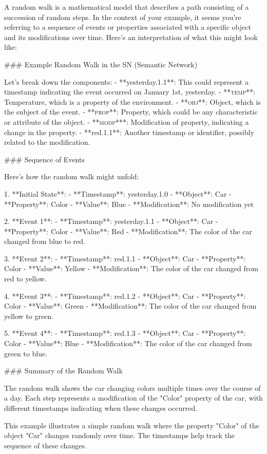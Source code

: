 A random walk is a mathematical model that describes a path consisting of a succession of random steps. In the context of your example, it seems you're referring to a sequence of events or properties associated with a specific object and its modifications over time. Here's an interpretation of what this might look like:

### Example Random Walk in the SN (Semantic Network)

Let's break down the components:
- **yesterday.1.1**: This could represent a timestamp indicating the event occurred on January 1st, yesterday.
- **\textsc{temp}**: Temperature, which is a property of the environment.
- **\textsc{obj}**: Object, which is the subject of the event.
- **\textsc{prop}**: Property, which could be any characteristic or attribute of the object.
- **\textsc{modp*}**: Modification of property, indicating a change in the property.
- **red.1.1**: Another timestamp or identifier, possibly related to the modification.

### Sequence of Events

Here’s how the random walk might unfold:

1. **Initial State**:
   - **Timestamp**: yesterday.1.0
   - **Object**: Car
   - **Property**: Color
   - **Value**: Blue
   - **Modification**: No modification yet

2. **Event 1**:
   - **Timestamp**: yesterday.1.1
   - **Object**: Car
   - **Property**: Color
   - **Value**: Red
   - **Modification**: The color of the car changed from blue to red.

3. **Event 2**:
   - **Timestamp**: red.1.1
   - **Object**: Car
   - **Property**: Color
   - **Value**: Yellow
   - **Modification**: The color of the car changed from red to yellow.

4. **Event 3**:
   - **Timestamp**: red.1.2
   - **Object**: Car
   - **Property**: Color
   - **Value**: Green
   - **Modification**: The color of the car changed from yellow to green.

5. **Event 4**:
   - **Timestamp**: red.1.3
   - **Object**: Car
   - **Property**: Color
   - **Value**: Blue
   - **Modification**: The color of the car changed from green to blue.

### Summary of the Random Walk

The random walk shows the car changing colors multiple times over the course of a day. Each step represents a modification of the "Color" property of the car, with different timestamps indicating when these changes occurred.

This example illustrates a simple random walk where the property "Color" of the object "Car" changes randomly over time. The timestamps help track the sequence of these changes.